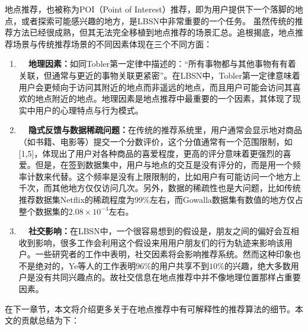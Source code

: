 地点推荐，也被称为POI（Point of Interest）推荐，即为用户提供下一个落脚的地点，或者探索可能感兴趣的地方，是LBSN中非常重要的一个任务。
虽然传统的推荐方法已经很成熟，但其无法完全移植到地点推荐的场景汇总。追根揭底，地点推荐场景与传统推荐场景的不同因素体现在三个不同方面：

\begin{enumerate}
    \item \textbf{~~地理因素：}如同Tobler第一定律中描述的：“所有事物都与其他事物有有着关联，但通常与更近的事物关联更紧密”。在LBSN中，Tobler第一定律意味着用户会更倾向于访问其附近的地点而非遥远的地点，而且用户可能会访问其喜欢的地点附近的地点。地理因素是地点推荐中最重要的一个因素，其体现了现实中用户的心理特点与行为模式。

    \item \textbf{~~隐式反馈与数据稀疏问题：}在传统的推荐系统里，用户通常会显示地对商品（如书籍、电影等）提交一个分数评价，这个分值通常有一个范围限制，如[1,5]，体现出了用户对各种商品的喜爱程度，更高的评分意味着更强烈的喜爱。但是，在签到数据集中，用户与地点的交互是没有评分的，而是用一个频率计数来代替。这个频率是没有上限限制的，比如用户有可能访问一个地方上千次，而其他地方仅仅访问几次。另外，数据的稀疏性也是大问题，比如传统推荐数据集Netflix的稀疏程度为$99\%$左右，而Gowalla数据集有数值的地方仅占整个数据集的$2.08 \times 10 ^ { - 4 }$左右。

    \item \textbf{~~社交影响：}在LBSN中，一个很容易想到的假设是，朋友之间的偏好会互相收到影响，很多工作会利用这个假设来用用户朋友们的行为轨迹来影响该用户。一些研究者的工作中表明，社交因素将会影响推荐系统。然而这种印象也不是绝对的，Ye等人的工作表明$96\%$的用户共享不到$10\%$的兴趣，绝大多数用户是没有共同兴趣点的。故社交信息在地点推荐中并不像地理位置那样占重要因素。
\end{enumerate}





在下一章节，本文将介绍更多关于在地点推荐中有可解释性的推荐算法的细节。本文的贡献总结为下：

